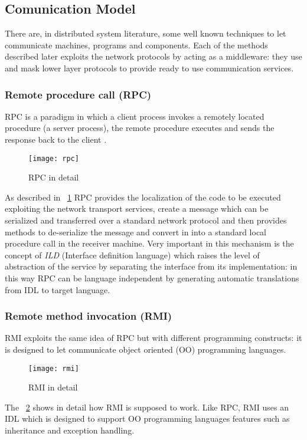 \subsection{Comunication Model} \label{mpi}
\par
There are, in distributed system literature, some well known techniques to let communicate machines, programs and components. Each of the methods described later exploits the network protocols by acting as a middleware: they use and mask lower layer protocols to provide ready to use communication services.

\subsubsection{Remote procedure call (RPC)} RPC is a paradigm in which a client process invokes a remotely located procedure (a server process), the remote procedure executes and sends the response back to the client \cite{Jerome2009Principles}.
\begin{figure}[h]
	\centering
	\texttt{[image: rpc]}
	\caption{RPC in detail}
	\label{fig:2.10}
\end{figure} 
As described in \figurename~\ref{fig:2.10} RPC provides the localization of the code to be executed exploiting the network transport services, create a message which can be serialized and transferred over a standard network protocol and then provides methods to de-serialize the message and convert in into a standard local procedure call in the receiver machine. Very important in this mechanism is the concept of \textit{ILD} (Interface definition language) which raises the level of abstraction of the service by separating the interface from its implementation: in this way RPC can be language independent by generating automatic translations from IDL to target language.  
\subsubsection{Remote method invocation (RMI)} \label{RMI} RMI exploits the same idea of RPC but with different programming constructs: it is designed to let communicate object oriented (OO) programming languages.
\begin{figure}[h]
	\centering
	\texttt{[image: rmi]}
	\caption{RMI in detail}
	\label{fig:2.11}
\end{figure} 
The \figurename~\ref{fig:2.11} shows in detail how RMI is supposed to work. Like RPC, RMI uses an IDL which is designed to support OO programming languages features such as inheritance and exception handling.

